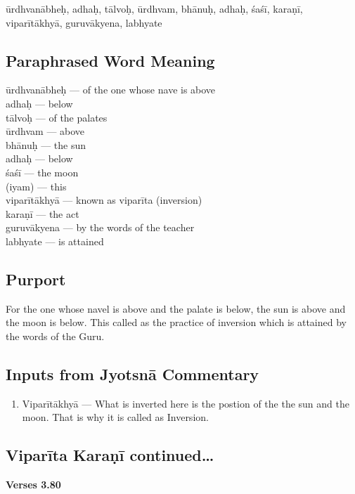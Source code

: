 ūrdhvanābheḥ, adhaḥ, tālvoḥ, ūrdhvam, bhānuḥ, adhaḥ, śaśī, karaṇī, viparītākhyā, guruvākyena, labhyate

\subsection*{Paraphrased Word Meaning}

\begin{multicols}{2}
ūrdhvanābheḥ --- of the one whose nave is above\\
adhaḥ ---  below \\
tālvoḥ --- of the palates  \\
ūrdhvam ---  above \\
bhānuḥ --- the sun \\
adhaḥ --- below \\
śaśī --- the moon\\ 
(iyam) --- this \\
viparītākhyā ---  known as viparīta (inversion)\\
karaṇī --- the act \\
guruvākyena ---  by the words of the teacher\\
labhyate --- is attained 
\end{multicols}

\subsection*{Purport}

For the one whose navel is above and the palate is below, the sun is above and the moon is below. This called as the practice of inversion which is attained by the words of the Guru. 

\subsection*{Inputs from Jyotsnā Commentary}

\begin{enumerate}
\item Viparītākhyā --- What is inverted here is the postion of the the sun and the moon. That is why it is called as Inversion.  
\end{enumerate}

\subsection*{Viparīta Karaṇī continued…}

\noindent \textbf{Verses 3.80}


